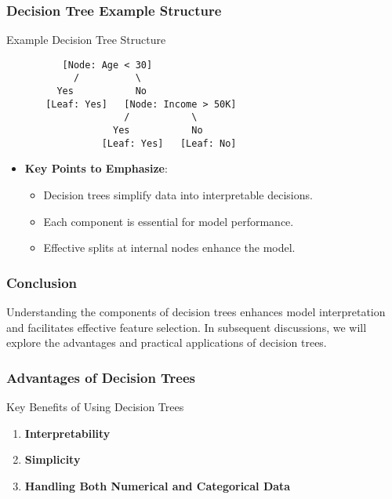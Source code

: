 \documentclass{beamer}
\begin{document}
\begin{frame}[fragile]
    \frametitle{Decision Tree Example Structure}
    \begin{block}{Example Decision Tree Structure}
    \begin{verbatim}
          [Node: Age < 30]
            /          \
         Yes           No
       [Leaf: Yes]   [Node: Income > 50K]
                     /           \
                   Yes           No
                 [Leaf: Yes]   [Leaf: No]
    \end{verbatim}
    \end{block}
    \begin{itemize}
        \item \textbf{Key Points to Emphasize}:
            \begin{itemize}
                \item Decision trees simplify data into interpretable decisions.
                \item Each component is essential for model performance.
                \item Effective splits at internal nodes enhance the model.
            \end{itemize}
    \end{itemize}
\end{frame}

\begin{frame}[fragile]
    \frametitle{Conclusion}
    Understanding the components of decision trees enhances model interpretation and facilitates effective feature selection. 
    In subsequent discussions, we will explore the advantages and practical applications of decision trees.
\end{frame}

\begin{frame}[fragile]
    \frametitle{Advantages of Decision Trees}
    \begin{block}{Key Benefits of Using Decision Trees}
        \begin{enumerate}
            \item \textbf{Interpretability}
            \item \textbf{Simplicity}
            \item \textbf{Handling Both Numerical and Categorical Data}
        \end{enumerate}
    \end{block}
\end{frame}
\end{document}
